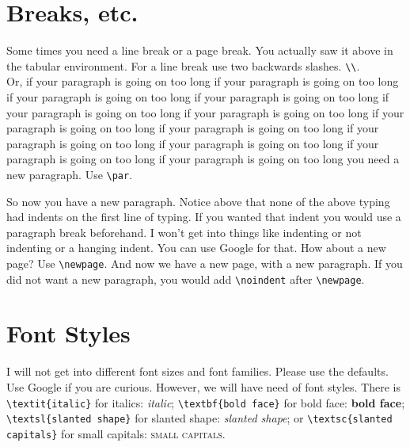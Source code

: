 \documentclass[12pt]{article}
\theoremstyle{definition}
\begin{document}
\section{Breaks, etc.}
Some times you need a line break or a page break. You actually saw it above in the tabular environment.  For a line break use two backwards slashes. \verb!\\!. \\ %
Or, if your paragraph is going on too long  if your paragraph is going on too long if your paragraph is going on too long if your paragraph is going on too long if your paragraph is going on too long if your paragraph is going on too long if your paragraph is going on too long if your paragraph is going on too long if your paragraph is going on too long if your paragraph is going on too long if your paragraph is going on too long if your paragraph is going on too long you need a new paragraph.  Use \verb!\par!.
\par%
So now you have a new paragraph.  Notice above that none of the above typing had indents on the first line of typing.  If you wanted that indent you would use a paragraph break beforehand. I won't get into things like indenting or not indenting or a hanging indent.  You can use Google for that. How about a new page?  Use \verb!\newpage!.
\newpage %
And now we have a new page, with a new paragraph.  If you did not want a new paragraph, you would add \verb!\noindent! after \verb!\newpage!.

\section{Font Styles}
I will not get into different font sizes and font families.  Please use the defaults.  Use Google if you are curious.  However, we will have need of font styles.  There is \verb!\textit{italic}! for italics: \textit{italic}; \verb!\textbf{bold face}! for bold face: \textbf{bold face}; \verb!\textsl{slanted shape}! for slanted shape: \textsl{slanted shape}; or \verb!\textsc{slanted capitals}! for small capitals: \textsc{small capitals}.
\end{document}

